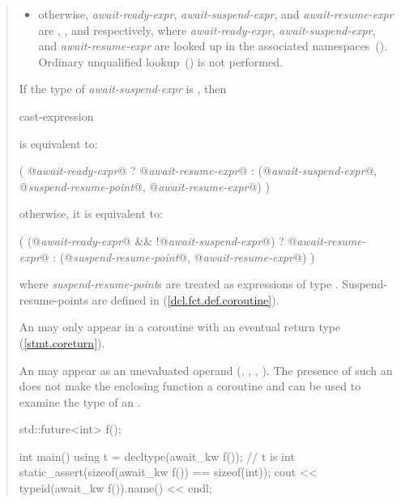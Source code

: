 \begin{quote}
\begin{itemize}
  \item otherwise, \textit{await-ready-expr}, \textit{await-suspend-expr}, and \textit{await-resume-expr} are 
  , 
  , and  
  respectively, where 
  \textit{await-ready-expr}, \textit{await-suspend-expr}, and \textit{await-resume-expr} are 
  looked up in the associated namespaces~().
  \enternote Ordinary unqualified lookup~() is not
  performed. \exitnote
\end{itemize}

If the type of \textit{await-suspend-expr} is \cvvoid, then

\begin{ncbnf}
   cast-expression
\end{ncbnf}
is equivalent to:
\begin{codeblock}
(
    @\textit{await-ready-expr}@ ? @\textit{await-resume-expr}@
    : (@\textit{await-suspend-expr}@, @\textit{suspend-resume-point}@, @\textit{await-resume-expr}@)
)
\end{codeblock}

otherwise, it is equivalent to:

\begin{codeblock}
(
    (@\textit{await-ready-expr}@ && !@\textit{await-suspend-expr}@) ? @\textit{await-resume-expr}@
    : (@\textit{suspend-resume-point}@, @\textit{await-resume-expr}@)
)
\end{codeblock}

where \textit{suspend-resume-point}s are treated as  expressions of type . Suspend-resume-points are defined in (\ref{dcl.fct.def.coroutine}).

\pnum
An  may only appear in a coroutine 
with an eventual return type (\ref{stmt.coreturn}).

\pnum
\enternote
An  may appear as an unevaluated operand (, , , ). The presence of such an  does not make the enclosing function a coroutine and can be used to examine the type of an .

\enterexample
\begin{codeblock}	
  std::future<int> f();
  
  int main() {
    using t = decltype(await_kw f()); // t is int
    static_assert(sizeof(await_kw f()) == sizeof(int));
    cout << typeid(await_kw f()).name() << endl;
  }
\end{codeblock}
\exitexample%
\exitnote

\end{quote}
